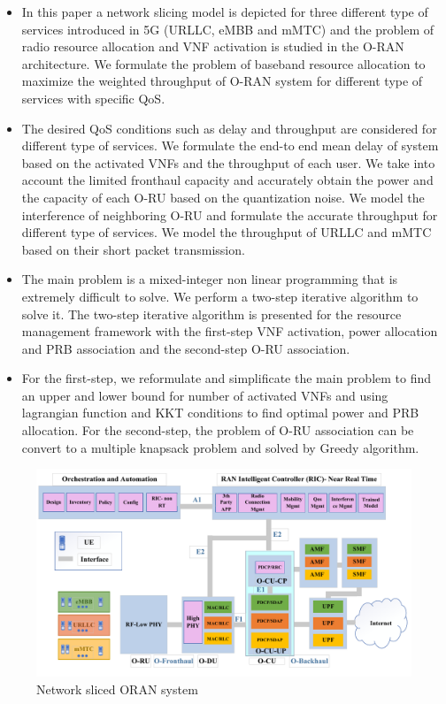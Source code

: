 \documentclass[conference]{IEEEtran}
\begin{document}
\begin{itemize}
\item In this paper a network slicing model is depicted for three different type of services introduced in 5G (URLLC, eMBB and mMTC) and the problem of radio resource allocation and VNF activation is studied in the O-RAN architecture.
We formulate the problem of baseband resource allocation to maximize the weighted throughput of O-RAN system for different type of services with specific QoS. 
\item The desired QoS conditions such as delay and throughput are considered for different type of services. We formulate the end-to end mean delay of system based on the activated VNFs and the throughput of each user.
We take into account the limited fronthaul capacity and accurately obtain the power and the capacity of each O-RU based on the quantization noise.
We model the interference of neighboring O-RU and formulate the accurate throughput
for different type of services. We model the throughput of URLLC and mMTC based on their short packet transmission.
\item The main problem is a mixed-integer non linear programming that is extremely difficult to solve.
We perform a two-step iterative algorithm to solve it.
The two-step iterative algorithm is presented for the resource management framework with the first-step VNF activation, power allocation and PRB association and the second-step O-RU association.
\item For the first-step, we reformulate and simplificate the main problem to find an upper and lower bound for number of activated VNFs and using lagrangian function and KKT conditions to find optimal power and PRB allocation.
For the second-step, the problem of O-RU association can be convert to a multiple knapsack problem and solved by Greedy algorithm.
\end{itemize}  

\begin{figure}
  \centering 
    \includegraphics[scale = 0.75]{finalDraw.pdf}
  \caption{Network sliced ORAN system}
  \label{fig:c11}
\end{figure}
\end{document}
